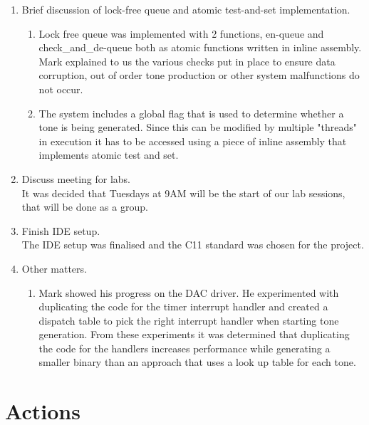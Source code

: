 \documentclass[11pt,a4paper]{scrartcl}
\begin{document}
\begin{enumerate}
\item Brief discussion of lock-free queue and atomic test-and-set implementation.
    \begin{enumerate}
        \item Lock free queue was implemented with 2 functions, en-queue and check\_and\_de-queue both as atomic functions written in inline assembly. Mark explained to us the various checks put in place to ensure data corruption, out of order tone production or other system malfunctions do not occur.
        \item The system includes a global flag that is used to determine whether a tone is being generated. Since this can be modified by multiple "threads" in execution it has to be accessed using a piece of inline assembly that implements atomic test and set.
    \end {enumerate}

\item Discuss meeting for labs.\\
\quad \quad It was decided that Tuesdays at 9AM will be the start of our lab sessions, that will be done as a group.

\item Finish IDE setup.\\
\quad \quad The IDE setup was finalised and the C11 standard was chosen for the project.

\item Other matters.
\begin{enumerate}
    \item Mark showed his progress on the DAC driver. He experimented with duplicating the code for the timer interrupt handler and created a dispatch table to pick the right interrupt handler when starting tone generation. From these experiments it was determined that duplicating the code for the handlers increases performance while generating a smaller binary than an approach that uses a look up table for each tone. 
\end{enumerate}

\end{enumerate}

\section*{Actions}
\end{document}
